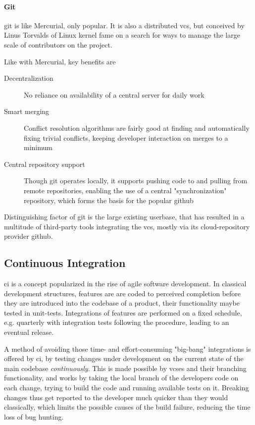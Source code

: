 \paragraph{Git}
\gls{git} is like Mercurial, only popular. It is also a distributed \gls{vcs}, but conceived by Linus Torvalds of Linux kernel fame on a search for ways to manage the large scale of contributors on the project.

Like with Mercurial, key benefits are
\begin{description}
	\item[Decentralization] No reliance on availability of a central server for daily work
	\item[Smart merging] Conflict resolution algorithms are fairly good at finding and automatically fixing trivial conflicts, keeping developer interaction on merges to a minimum
	\item[Central repository support] Though git operates locally, it supports pushing code to and pulling from remote repositories, enabling the use of a central "synchronization" repository, which forms the basis for the popular \gls{github} 
\end{description}

Distinguishing factor of \gls{git} is the large existing userbase, that has resulted in a multitude of third-party tools integrating the \gls{vcs}, mostly via its \gls{cloud}-repository provider \gls{github}.

\subsection{Continuous Integration}
\gls{ci} is a concept popularized in the rise of agile software development. In classical development structures, features are are coded to perceived completion before they are introduced into the codebase of a product, their functionality maybe tested in unit-tests. Integrations of features are performed on a fixed schedule, e.g. quarterly with integration tests following the procedure, leading to an eventual release.

A method of avoiding those time- and effort-consuming "big-bang" integrations is offered by \gls{ci}, by testing changes under development on the current state of the main codebase \textit{continuously}. This is made possible by \gls{vcs}es and their branching functionality, and works by taking the local branch of the developers code on each change, trying to build the code and running available tests on it. Breaking changes thus get reported to the developer much quicker than they would classically, which limits the possible causes of the build failure, reducing the time loss of bug hunting.

